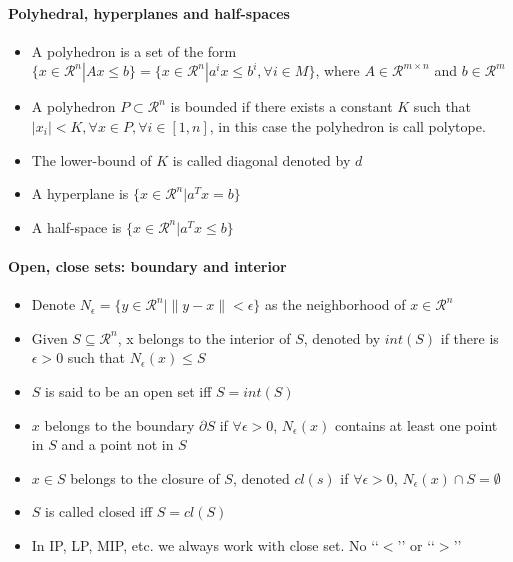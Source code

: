                 \paragraph{Polyhedral, hyperplanes and half-spaces}
                    \begin{itemize}
                        \item A polyhedron is a set of the form $\{x\in \mathcal{R}^n|Ax\le b\}=\{x \in \mathcal{R}^n | a^ix\le b^i, \forall i \in M\}$, where $A \in \mathcal{R}^{m\times n}$ and $b \in \mathcal{R}^m$
                        \item A polyhedron $P \subset \mathcal{R}^n$ is bounded if there exists a constant $K$ such that $|x_i|<K, \forall x \in P, \forall i \in [1, n]$, in this case the polyhedron is call polytope.
                        \item The lower-bound of $K$ is called diagonal denoted by $d$
                        \item A hyperplane is $\{x\in \mathcal{R}^n|a^Tx=b\}$
                        \item A half-space is $\{x\in \mathcal{R}^n|a^Tx\le b\}$
                    \end{itemize}

                \paragraph{Open, close sets: boundary and interior}
                    \begin{itemize}
                        \item Denote $N_\epsilon = \{y\in \mathcal{R}^n|\lVert y-x\rVert < \epsilon \}$ as the neighborhood of $x\in \mathcal{R}^n$
                        \item Given $S\subseteq \mathcal{R}^n$, x belongs to the interior of $S$, denoted by $int(S)$ if there is $\epsilon > 0$ such that $N_\epsilon(x) \le S$
                        \item $S$ is said to be an open set iff $S=int(S)$
                        \item $x$ belongs to the boundary $\partial S$ if $\forall \epsilon >0$, $N_\epsilon(x)$ contains at least one point in $S$ and a point not in $S$
                        \item $x\in S$ belongs to the closure of $S$, denoted $cl(s)$ if $\forall \epsilon > 0$, $N_\epsilon(x) \cap S = \emptyset$
                        \item $S$ is called closed iff $S=cl(S)$
                        \item In IP, LP, MIP, etc. we always work with close set. No \lq\lq{}$<$\rq\rq{} or \lq\lq{}$>$\rq\rq{}
                    \end{itemize}

